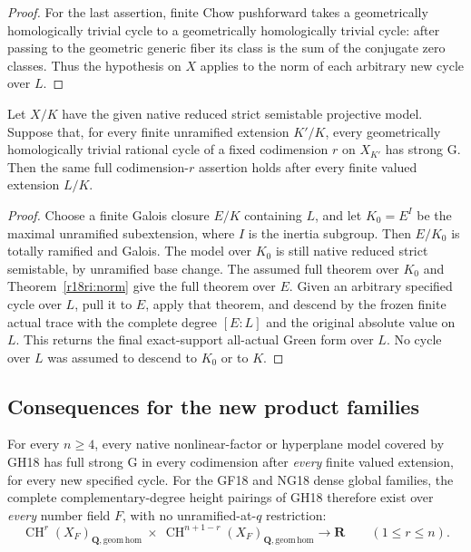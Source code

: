 \begin{proof}
For the last assertion, finite Chow pushforward takes a geometrically
homologically trivial cycle to a geometrically homologically trivial
cycle: after passing to the geometric generic fiber its class is the
sum of the conjugate zero classes.  Thus the hypothesis on $X$
applies to the norm of each arbitrary new cycle over $L$.
\end{proof}

\begin{corollary}
\label{r18ri:all-finite}
Let $X/K$ have the given native reduced strict semistable projective
model.  Suppose that, for every finite unramified extension $K'/K$,
every geometrically homologically trivial rational cycle of a fixed
codimension $r$ on $X_{K'}$ has strong G.  Then the same full
codimension-$r$ assertion holds after every finite valued extension
$L/K$.
\end{corollary}

\begin{proof}
Choose a finite Galois closure $E/K$ containing $L$, and let
$K_0=E^{I}$ be the maximal unramified subextension, where $I$ is
the inertia subgroup.  Then $E/K_0$ is totally ramified and Galois.
The model over $K_0$ is still native reduced strict semistable,
by unramified base change.  The assumed full theorem over $K_0$
and Theorem~\ref{r18ri:norm} give the full theorem over $E$.
Given an arbitrary specified cycle over $L$, pull it to $E$,
apply that theorem, and descend by the frozen finite actual trace
with the complete degree $[E:L]$ and the original absolute value
on $L$.  This returns the final exact-support all-actual Green
form over $L$.  No cycle over $L$ was assumed to descend to $K_0$
or to $K$.
\end{proof}

\subsection{Consequences for the new product families}

\begin{corollary}
\label{r18ri:product-families}
For every $n\ge4$, every native nonlinear-factor or hyperplane
model covered by GH18 has full strong G in every codimension after
\emph{every} finite valued extension, for every new specified cycle.
For the GF18 and NG18 dense global families, the complete
complementary-degree height pairings of GH18 therefore exist over
\emph{every} number field $F$, with no unramified-at-$q$ restriction:
\[
 \operatorname{CH}^r(X_F)_{\mathbf Q,\mathrm{geom\,hom}}
 \ \times\
 \operatorname{CH}^{n+1-r}(X_F)_{\mathbf Q,\mathrm{geom\,hom}}
                                   \longrightarrow\mathbf R
                 \qquad(1\le r\le n).
 \tag{RI18.13}\label{r18ri:all-heights}
\]
\end{corollary}

